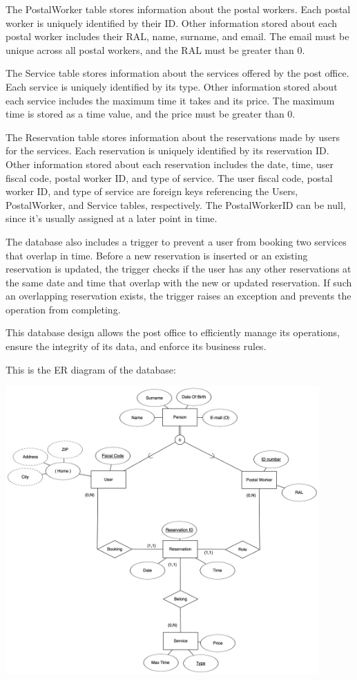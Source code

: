 \documentclass{article}
\begin{document}
The PostalWorker table stores information about the postal workers. Each postal worker is uniquely identified by their ID\@. Other information stored about each postal worker includes their RAL, name, surname, and email. The email must be unique across all postal workers, and the RAL must be greater than 0.

The Service table stores information about the services offered by the post office. Each service is uniquely identified by its type. Other information stored about each service includes the maximum time it takes and its price. The maximum time is stored as a time value, and the price must be greater than 0.

The Reservation table stores information about the reservations made by users for the services. Each reservation is uniquely identified by its reservation ID\@. Other information stored about each reservation includes the date, time, user fiscal code, postal worker ID, and type of service. The user fiscal code, postal worker ID, and type of service are foreign keys referencing the Users, PostalWorker, and Service tables, respectively. The PostalWorkerID can be null, since it's usually assigned at a later point in time.

The database also includes a trigger to prevent a user from booking two services that overlap in time. Before a new reservation is inserted or an existing reservation is updated, the trigger checks if the user has any other reservations at the same date and time that overlap with the new or updated reservation. If such an overlapping reservation exists, the trigger raises an exception and prevents the operation from completing.

This database design allows the post office to efficiently manage its operations, ensure the integrity of its data, and enforce its business rules.

This is the ER diagram of the database:
\begin{center}
\includegraphics[width=12cm]{images/PostOfficeERdiagram.png}
\end{center}
\end{document}
